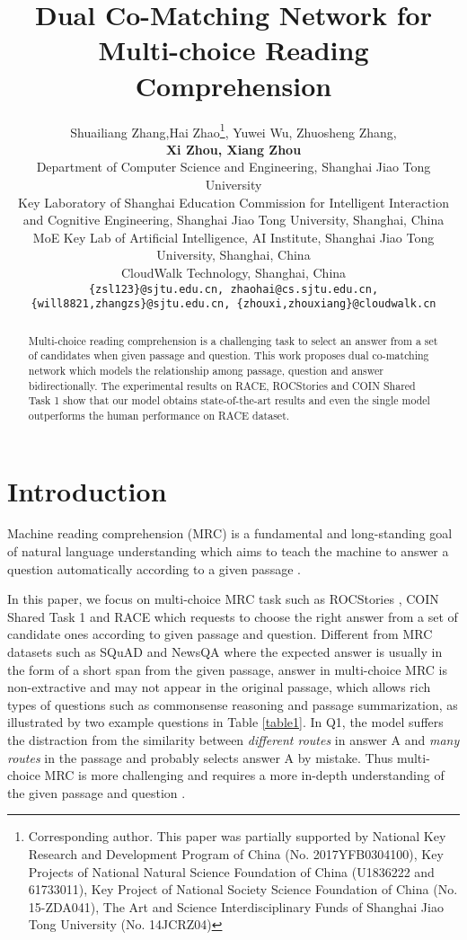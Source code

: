 \documentclass[11pt,a4paper]{article}
\title{Dual Co-Matching Network for Multi-choice Reading Comprehension}
\author{Shuailiang Zhang,Hai Zhao\thanks{ Corresponding author. This paper was partially supported by National Key Research and Development Program of China (No. 2017YFB0304100), 
		Key Projects of National Natural Science Foundation of China (U1836222 and 61733011), 
		Key Project of National Society Science Foundation of China (No. 15-ZDA041), 
		The Art and Science Interdisciplinary Funds of Shanghai Jiao Tong University (No. 14JCRZ04)}, Yuwei Wu, Zhuosheng Zhang, 
	\\  \Large\textbf{Xi Zhou, Xiang Zhou}\\
	Department of Computer Science and Engineering, Shanghai Jiao Tong University \\
	Key Laboratory of Shanghai Education Commission for Intelligent Interaction \\ and Cognitive Engineering, Shanghai Jiao Tong University, Shanghai, China\\
	MoE Key Lab of Artificial Intelligence, AI Institute, Shanghai Jiao Tong University, Shanghai, China\\
	CloudWalk Technology, Shanghai, China\\
	{\tt \{zsl123\}@sjtu.edu.cn, zhaohai@cs.sjtu.edu.cn,}\\
	{\tt  \{will8821,zhangzs\}@sjtu.edu.cn, \{zhouxi,zhouxiang\}@cloudwalk.cn}\\
}
\date{}
\begin{document}
	\maketitle
	\begin{abstract}
		Multi-choice reading comprehension is a challenging task to select an answer from a set of candidates when given passage and question.  This work proposes dual co-matching network which models the relationship among passage, question and answer bidirectionally. The experimental results on RACE, ROCStories and COIN Shared Task 1 show that our model obtains state-of-the-art results and even the single model outperforms the human performance on RACE dataset.
	\end{abstract}
	
	\section{Introduction}
	
	Machine reading comprehension (MRC) is a fundamental and long-standing goal of natural language understanding which aims to teach the machine to answer a question automatically according to a given passage \cite{Hermann15, Rajpurkar-D16, NguyenRSGTMD16}. 
	
	In this paper, we focus on multi-choice MRC task such as ROCStories \cite{roc2016-corpus}, COIN Shared Task 1 \cite{semeval11} and RACE \cite{Lai-2017} which requests to choose the right answer from a set of candidate ones according to given passage and question. Different from MRC datasets such as SQuAD \cite{Rajpurkar-D16} and NewsQA \cite{Trischler-W17} where the expected answer is usually in the form of a short span from the given passage, answer in multi-choice MRC is non-extractive and may not appear in the original passage, which allows rich types of questions such as commonsense reasoning and passage summarization, as illustrated by two example questions in Table \ref{table1}. In Q1, the model suffers the distraction from the similarity between \textit{different routes} in answer A and \textit{many routes} in the passage and probably selects answer A by mistake. Thus multi-choice MRC is more challenging and requires a more in-depth understanding of the given passage and question \cite{Lai-2017, Khashabi-N18-1023}.  
	
\end{document}

